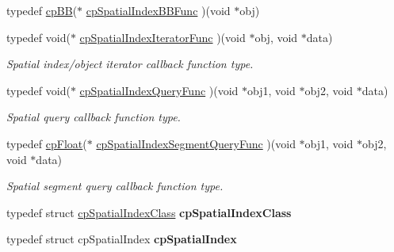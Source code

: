 \begin{DoxyCompactItemize}
\item 
typedef \hyperlink{structcp_b_b}{cp\-B\-B}($\ast$ \hyperlink{group__cp_spatial_index_gafbecd34bd436d4a56200b7a542d94fc1}{cp\-Spatial\-Index\-B\-B\-Func} )(void $\ast$obj)
\item 
\hypertarget{group__cp_spatial_index_gaf46e9eeecddefacab2be48aadd5d1a1d}{typedef void($\ast$ \hyperlink{group__cp_spatial_index_gaf46e9eeecddefacab2be48aadd5d1a1d}{cp\-Spatial\-Index\-Iterator\-Func} )(void $\ast$obj, void $\ast$data)}\label{group__cp_spatial_index_gaf46e9eeecddefacab2be48aadd5d1a1d}

\begin{DoxyCompactList}\small\item\em Spatial index/object iterator callback function type. \end{DoxyCompactList}\item 
\hypertarget{group__cp_spatial_index_ga4885d6b7a5f9f613a19a25e1c7ec5073}{typedef void($\ast$ \hyperlink{group__cp_spatial_index_ga4885d6b7a5f9f613a19a25e1c7ec5073}{cp\-Spatial\-Index\-Query\-Func} )(void $\ast$obj1, void $\ast$obj2, void $\ast$data)}\label{group__cp_spatial_index_ga4885d6b7a5f9f613a19a25e1c7ec5073}

\begin{DoxyCompactList}\small\item\em Spatial query callback function type. \end{DoxyCompactList}\item 
\hypertarget{group__cp_spatial_index_ga60396867350f1f81025575e825ec852f}{typedef \hyperlink{group__basic_types_gac1ed65573e035bf892505768c852d8d3}{cp\-Float}($\ast$ \hyperlink{group__cp_spatial_index_ga60396867350f1f81025575e825ec852f}{cp\-Spatial\-Index\-Segment\-Query\-Func} )(void $\ast$obj1, void $\ast$obj2, void $\ast$data)}\label{group__cp_spatial_index_ga60396867350f1f81025575e825ec852f}

\begin{DoxyCompactList}\small\item\em Spatial segment query callback function type. \end{DoxyCompactList}\item 
\hypertarget{group__cp_spatial_index_ga0e6be503abc1229a5da339a30ee6f88e}{typedef struct \hyperlink{structcp_spatial_index_class}{cp\-Spatial\-Index\-Class} {\bfseries cp\-Spatial\-Index\-Class}}\label{group__cp_spatial_index_ga0e6be503abc1229a5da339a30ee6f88e}

\item 
\hypertarget{group__cp_spatial_index_ga1af77c242def41e791d49350c809cc7f}{typedef struct cp\-Spatial\-Index {\bfseries cp\-Spatial\-Index}}\label{group__cp_spatial_index_ga1af77c242def41e791d49350c809cc7f}


\end{DoxyCompactItemize}

